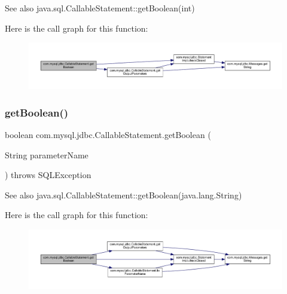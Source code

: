 \begin{DoxySeeAlso}{See also}
java.\+sql.\+Callable\+Statement\+::get\+Boolean(int) 
\end{DoxySeeAlso}
Here is the call graph for this function\+:\nopagebreak
\begin{figure}[H]
\begin{center}
\leavevmode
\includegraphics[width=350pt]{classcom_1_1mysql_1_1jdbc_1_1_callable_statement_ad482ae86ec044429a8b799f314138414_cgraph}
\end{center}
\end{figure}
\mbox{\label{classcom_1_1mysql_1_1jdbc_1_1_callable_statement_ad095a4d47834a2d48e932bdeef1ea423}} 
\subsubsection{\texorpdfstring{get\+Boolean()}{getBoolean()}\hspace{0.1cm}{\footnotesize\ttfamily [2/2]}}
{\footnotesize\ttfamily boolean com.\+mysql.\+jdbc.\+Callable\+Statement.\+get\+Boolean (\begin{DoxyParamCaption}\item[{String}]{parameter\+Name }\end{DoxyParamCaption}) throws S\+Q\+L\+Exception}

\begin{DoxySeeAlso}{See also}
java.\+sql.\+Callable\+Statement\+::get\+Boolean(java.\+lang.\+String) 
\end{DoxySeeAlso}
Here is the call graph for this function\+:\nopagebreak
\begin{figure}[H]
\begin{center}
\leavevmode
\includegraphics[width=350pt]{classcom_1_1mysql_1_1jdbc_1_1_callable_statement_ad095a4d47834a2d48e932bdeef1ea423_cgraph}
\end{center}
\end{figure}
\mbox{\label{classcom_1_1mysql_1_1jdbc_1_1_callable_statement_afba99b96d6516655bdf25f4dfa49b687}} 
